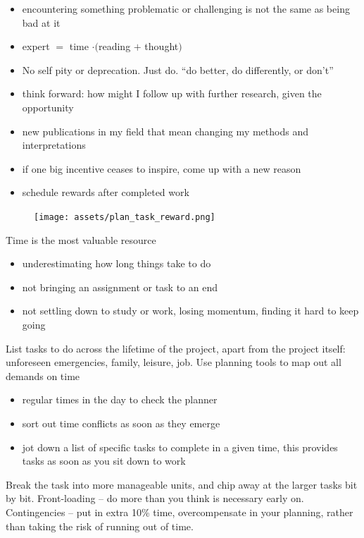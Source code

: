 \documentclass[10pt,a4paper,twocolumn]{article}
\begin{document}
\begin{itemize}
  \item encountering something problematic or challenging is not the same as being bad at it
  \item expert $=$ time $\cdot \bigl($reading $+$ thought$\bigr)$
  \item No self pity or deprecation. Just do. ``do better, do differently, or don't''
  \item think forward: how might I follow up with further research, given the opportunity
\end{itemize}

\begin{itemize}
  \item new publications in my field that mean changing my methods and interpretations
\end{itemize}

\begin{itemize}
  \item if one big incentive ceases to inspire, come up with a new reason
  \item schedule rewards after completed work
\end{itemize}
\begin{figure}
  \centering
  \texttt{[image: assets/plan\_task\_reward.png]}
\end{figure}

Time is the most valuable resource
\begin{itemize}
  \item underestimating how long things take to do
  \item not bringing an assignment or task to an end
  \item not settling down to study or work, losing momentum, finding it hard to keep going
\end{itemize}

List tasks to do across the lifetime of the project, apart from the project itself:
unforeseen emergencies, family, leisure, job. Use planning tools to map out all demands
on time
\begin{itemize}
  \item regular times in the day to check the planner
  \item sort out time conflicts as soon as they emerge
  \item jot down a list of specific tasks to complete in a given time, this provides
  tasks as soon as you sit down to work
\end{itemize}
Break the task into more manageable units, and chip away at the larger tasks bit by bit.
Front-loading -- do more than you think is necessary early on. Contingencies -- put in
extra 10\% time, overcompensate in your planning, rather than taking the risk of running
out of time.
\end{document}
